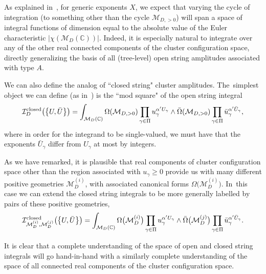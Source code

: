\documentclass[pdftex]{sigma}%
\def\C{{\mathbb C}}
\def\I{{\mathcal{I}}}
\def\M{{\mathcal{M}}}
\numberwithin{equation}{section}
\begin{document}
As explained in~\cite[Section~7]{AHL}, for generic exponents $X$, we expect that varying the cycle of integration (to something other than the cycle $\M_{D,>0}$) will span a space of integral functions of dimension equal to the absolute value of the Euler characteristic $|\chi(\M_D(\C))|$. Indeed, it is especially natural to integrate over any of the other real connected components of the cluster configuration space, directly generalizing the basis of all (tree-level) open string amplitudes associated with type $A$.

We can also define the analog of ``closed string" cluster amplitudes. The~simplest object we can define (as in~\cite{AHL}) is the ``mod square" of the open string integral
\begin{gather*}
\I_{D}^{\rm{closed}}\big(\big\{U,\bar{U}\big\}\big)=
\int_{\M_D(\C)} \Omega(\M_{D,>0}) \prod_{\gamma \in \Pi} u_\gamma^{\alpha' U_\gamma} \wedge
 \bar{\Omega}(\M_{D,>0}) \prod_{\gamma \in \Pi} \bar{u}_\gamma^{\alpha' \bar{U}_\gamma},
\end{gather*}
where in order for the integrand to be single-valued, we must have that the exponents $\bar{U}_\gamma$ differ from $U_\gamma$ at most by integers.

As we have remarked, it is plausible that real components of cluster configuration space other than the region associated with $u_\gamma \geq 0$ provide us with many different positive geometries $\M^{(i)}_{D}$, with associated canonical forms
$ \Omega\big(\M^{(i)}_{D}\big) $. In~this case we can extend the closed string integrals to be more generally labelled by pairs of these positive geometries,
\begin{gather*}
\I_{\M^{(i)}_{D},\M^{(j)}_{D}}^{\rm{closed}}\big(\big\{U,\bar{U}\big\}\big)=
\int_{\M_D(\C)} \Omega\big(\M^{(i)}_{D}\big) \prod_{\gamma \in \Pi} u_\gamma^{\alpha' U_\gamma} \wedge
 \bar{\Omega}\big(\M^{(j)}_{D}\big) \prod_{\gamma \in \Pi} \bar{u}_\gamma^{\alpha' \bar{U}_\gamma}.
\end{gather*}

It is clear that a complete understanding of the space of open and closed string integrals will go hand-in-hand with a similarly complete understanding of the space of all connected real components of the cluster configuration space.
\end{document}
